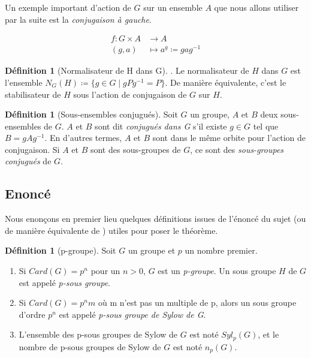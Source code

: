 \documentclass[french]{article}
\theoremstyle{definition}
\newtheorem{definition}[subsubsection]{Définition}
\theoremstyle{plain}
\theoremstyle{plain}
\theoremstyle{plain}
\theoremstyle{plain}
\theoremstyle{plain}
\begin{document}
Un exemple important d'action de \( G \) sur un ensemble \( A \) que nous allons utiliser par la suite est la \textit{conjugaison à gauche}.


\begin{align*}
	f : G \times A &\to A \\
	(g,a) &\mapsto a^{g} \coloneq gag^{-1}
\end{align*}

\begin{definition}[Normalisateur de H dans G]\cite[p.~217]{chen2024napkin}.
	Le normalisateur de \( H \) dans \( G \) est l'ensemble 
	\( N_{G}({H}) \coloneq \{ g \in G \mid gPg^{-1} = P \} \).
	De manière équivalente, c'est le stabilisateur de \( H \) sous l'action de conjugaison de \( G \) sur \( H \).
\end{definition}

\begin{definition}[Sous-ensembles conjugués]\cite[p. ~123]{dummit2003abstract} 
	Soit \( G \) un groupe, \( A \) et \( B \) deux sous-ensembles de \( G \). 
	\( A \) et \( B \) sont dit 
	\textit{conjugués dans G} s'il existe \( g \in G \) tel que \( B = gAg^{-1} \).
	En d'autres termes, \( A \) et \( B \) sont dans le même orbite pour l'action de conjugaison. Si \( A \) et \( B \) sont des sous-groupes de \( G \), ce sont des \textit{sous-groupes conjugués} de \( G \).
\end{definition}


\subsection{Enoncé}

Nous enonçons en premier lieu quelques définitions issues de l'énoncé du sujet (ou de manière équivalente de \cite[p. ~123 et 139]{dummit2003abstract}) utiles pour poser le théorème.

\begin{definition}[p-groupe]
	Soit \( G \) un groupe et \( p \) un nombre premier.
	\begin{enumerate}[label = (\roman*)]
	\item Si \( Card(G) = p^{n} \) pour un \( n > 0 \), \( G \) est un \textit{p-groupe}. Un sous groupe \( H \) de \( G \) est appelé \textit{p-sous groupe}.
	\item Si \( Card(G) = p^{n}m \) où m n'est pas un multiple de p, alors un sous groupe d'ordre \( p^{n} \) est appelé \textit{p-sous groupe de Sylow de G}.
	\item L'ensemble des p-sous groupes de Sylow de \( G \) est noté \( Syl_{p}(G) \), et le nombre de p-sous groupes de Sylow de \( G \) est noté \( n_{p}(G) \).
	\end{enumerate}
\end{definition}
\end{document}
